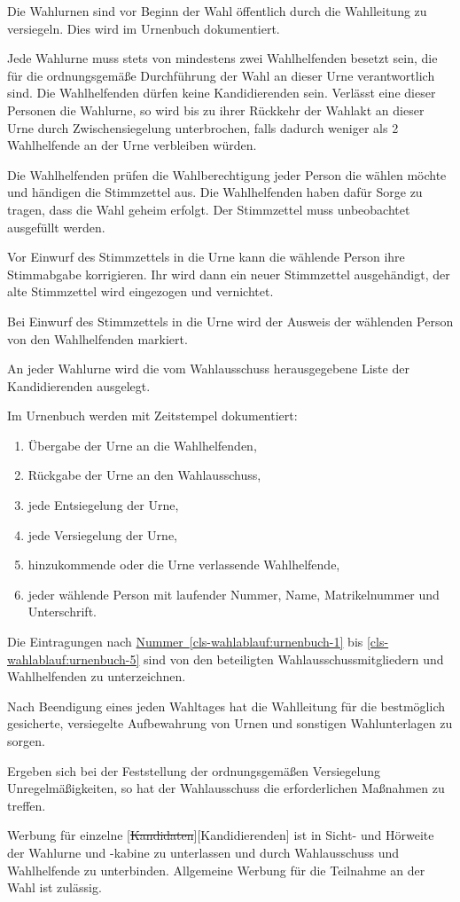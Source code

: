 \documentclass[%
draft,%
multilinesections%
]{fswo}
\newcommand\oldT[1]  {{\color{Gray}[\st{#1}]}}
\newcommand\newT[1]  {{\color{Green}[#1]}}
\newcommand\oldT[1]{}%
\newcommand\newT[1]{#1}
\newcommand\change[2]{\oldT{#1}\newT{#2}}
\newcommand*{\refItem}[1]{\hyperref[#1]{Nummer~\ref{#1}}}
\begin{document}
\begin{contract}
Die Wahlurnen sind vor Beginn der Wahl öffentlich durch die Wahlleitung zu versiegeln.
Dies wird im Urnenbuch dokumentiert.

Jede Wahlurne muss stets von mindestens zwei Wahlhelfenden besetzt sein, die für die ordnungsgemäße Durchführung der Wahl an dieser Urne verantwortlich sind.
Die Wahlhelfenden dürfen keine Kandidierenden sein.
Verlässt eine dieser Personen die Wahlurne, so wird bis zu ihrer Rückkehr der Wahlakt an dieser Urne durch Zwischensiegelung unterbrochen, falls dadurch weniger als 2 Wahlhelfende an der Urne verbleiben würden.

Die Wahlhelfenden prüfen die Wahlberechtigung jeder Person die wählen möchte und händigen die Stimmzettel aus.
Die Wahlhelfenden haben dafür Sorge zu tragen, dass die Wahl geheim erfolgt.
Der Stimmzettel muss unbeobachtet ausgefüllt werden.

Vor Einwurf des Stimmzettels in die Urne kann die wählende Person ihre Stimmabgabe korrigieren.
Ihr wird dann ein neuer Stimmzettel ausgehändigt, der alte Stimmzettel wird eingezogen und vernichtet.

Bei Einwurf des Stimmzettels in die Urne wird der Ausweis der wählenden Person von den Wahlhelfenden markiert.

An jeder Wahlurne wird die vom Wahlausschuss herausgegebene Liste der Kandidierenden ausgelegt.

Im Urnenbuch werden mit Zeitstempel dokumentiert:
\begin{enumerate}
\item Übergabe der Urne an die Wahlhelfenden,\label{cls-wahlablauf:urnenbuch-1}
\item Rückgabe der Urne an den Wahlausschuss,
\item jede Entsiegelung der Urne,
\item jede Versiegelung der Urne,
\item hinzukommende oder die Urne verlassende Wahlhelfende,\label{cls-wahlablauf:urnenbuch-5}
\item jeder wählende Person mit laufender Nummer, Name, Matrikelnummer und Unterschrift.
\end{enumerate}
Die Eintragungen nach \refItem{cls-wahlablauf:urnenbuch-1} bis \ref{cls-wahlablauf:urnenbuch-5} sind von den beteiligten Wahlausschussmitgliedern und Wahlhelfenden zu unterzeichnen.

Nach Beendigung eines jeden Wahltages hat die Wahlleitung für die bestmöglich gesicherte, versiegelte Aufbewahrung von Urnen und sonstigen Wahlunterlagen zu sorgen.

Ergeben sich bei der Feststellung der ordnungsgemäßen Versiegelung Unregelmäßigkeiten, so hat der Wahlausschuss die erforderlichen Maßnahmen zu treffen.

Werbung für einzelne \change{Kandidaten}{Kandidierenden} ist in Sicht- und Hörweite der Wahlurne und -kabine zu unterlassen und durch Wahlausschuss und Wahlhelfende zu unterbinden.
Allgemeine Werbung für die Teilnahme an der Wahl ist zulässig.
\end{contract}
\end{document}
